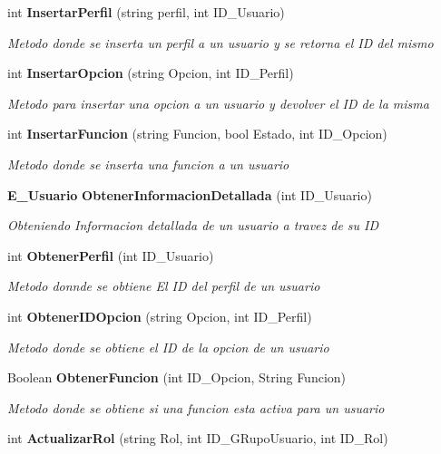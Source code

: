 \begin{DoxyCompactItemize}
int {\bf Insertar\+Perfil} (string perfil, int I\+D\+\_\+\+Usuario)
\begin{DoxyCompactList}\small\item\em Metodo donde se inserta un perfil a un usuario y se retorna el ID del mismo \end{DoxyCompactList}\item 
int {\bf Insertar\+Opcion} (string Opcion, int I\+D\+\_\+\+Perfil)
\begin{DoxyCompactList}\small\item\em Metodo para insertar una opcion a un usuario y devolver el ID de la misma \end{DoxyCompactList}\item 
int {\bf Insertar\+Funcion} (string Funcion, bool Estado, int I\+D\+\_\+\+Opcion)
\begin{DoxyCompactList}\small\item\em Metodo donde se inserta una funcion a un usuario \end{DoxyCompactList}\item 
{\bf E\+\_\+\+Usuario} {\bf Obtener\+Informacion\+Detallada} (int I\+D\+\_\+\+Usuario)
\begin{DoxyCompactList}\small\item\em Obteniendo Informacion detallada de un usuario a travez de su ID \end{DoxyCompactList}\item 
int {\bf Obtener\+Perfil} (int I\+D\+\_\+\+Usuario)
\begin{DoxyCompactList}\small\item\em Metodo donnde se obtiene El ID del perfil de un usuario \end{DoxyCompactList}\item 
int {\bf Obtener\+I\+D\+Opcion} (string Opcion, int I\+D\+\_\+\+Perfil)
\begin{DoxyCompactList}\small\item\em Metodo donde se obtiene el ID de la opcion de un usuario \end{DoxyCompactList}\item 
Boolean {\bf Obtener\+Funcion} (int I\+D\+\_\+\+Opcion, String Funcion)
\begin{DoxyCompactList}\small\item\em Metodo donde se obtiene si una funcion esta activa para un usuario \end{DoxyCompactList}\item 
int {\bf Actualizar\+Rol} (string Rol, int I\+D\+\_\+\+G\+Rupo\+Usuario, int I\+D\+\_\+\+Rol)

\end{DoxyCompactItemize}
